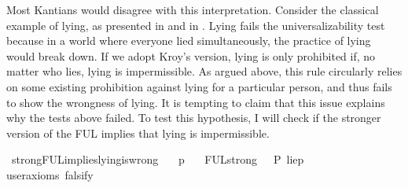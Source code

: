 \begin{isabellebody}
\begin{isamarkuptext}
Most Kantians would disagree with this interpretation. Consider the classical example of lying, as presented 
in \cite{kemp} and in \cite{KorsgaardFUL}. Lying fails the universalizability test because in a 
world where everyone lied simultaneously, the practice of lying would break down. If we adopt Kroy's 
version, lying is only prohibited if, no matter who lies, lying is impermissible. As argued above, this 
rule circularly relies on some existing prohibition against lying for a particular person, and thus 
fails to show the wrongness of lying. It is tempting to claim that this issue explains why the tests 
above failed. To test this hypothesis, I will check if the stronger version 
of the FUL implies that lying is impermissible.%
\end{isamarkuptext}\isamarkuptrue%
\isamarkupfalse%
\ strongFUL{\isacharunderscore}implies{\isacharunderscore}lying{\isacharunderscore}is{\isacharunderscore}wrong{\isacharcolon}\isanewline
\ \ \ p\isanewline
\ \ \ {\isachardoublequoteopen}FUL{\isacharunderscore}strong\ {\isasymlongrightarrow}\ {\isasymTurnstile}{\isacharparenleft}\isactrlbold {\isasymnot}\ P\ {\isacharbraceleft}lie{\isacharparenleft}p{\isacharparenright}{\isacharbraceright}{\isacharparenright}{\isachardoublequoteclose}\isanewline
\ \ \isamarkupfalse%
{\isacharbrackleft}user{\isacharunderscore}axioms{\isacharcomma}\ falsify{\isacharbrackright}%
\isadelimproof
\ %
\endisadelimproof
%
\isatagproof
{}\isamarkupfalse%
\isanewline
%
\end{isabellebody}

